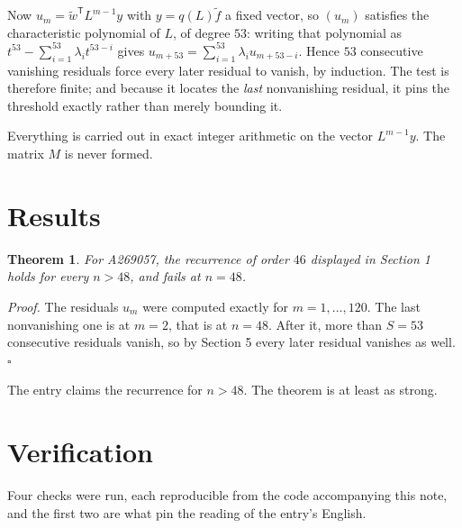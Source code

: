 \documentclass[11pt]{article}
\newtheorem{theorem}{Theorem}
\theoremstyle{definition}
\begin{document}
Now $u_m = \tilde w^{\mathsf T} L^{m-1} y$ with $y = q(L)\tilde f$ a fixed vector, so $(u_m)$ satisfies the characteristic polynomial of $L$, of degree $53$: writing that polynomial as $t^{53} - \sum_{i=1}^{53} \lambda_i t^{53-i}$ gives $u_{m+53} = \sum_{i=1}^{53} \lambda_i u_{m+53-i}$. Hence $53$ consecutive vanishing residuals force every later residual to vanish, by induction. The test is therefore finite; and because it locates the {\itshape last} nonvanishing residual, it pins the threshold exactly rather than merely bounding it.

Everything is carried out in exact integer arithmetic on the vector $L^{m-1}y$. The matrix $M$ is never formed.

\section{Results}

\begin{theorem} For A269057, the recurrence of order $46$ displayed in Section 1 holds for every $n > 48$, and fails at $n = 48$.\end{theorem}

{\itshape Proof.} The residuals $u_m$ were computed exactly for $m = 1,\dots,120$. The last nonvanishing one is at $m = 2$, that is at $n = 48$. After it, more than $S = 53$ consecutive residuals vanish, so by Section 5 every later residual vanishes as well. $\square$

The entry claims the recurrence for $n > 48$. The theorem is at least as strong.

\section{Verification}

Four checks were run, each reproducible from the code accompanying this note, and the first two are what pin the reading of the entry's English.
\end{document}
